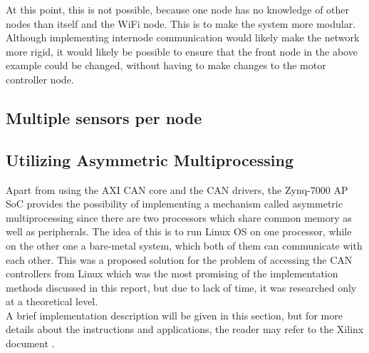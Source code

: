 At this point, this is not possible, because one node has no knowledge of other nodes than itself and the WiFi node. 
This is to make the system more modular.
Although implementing internode communication would likely make the network more rigid, it would likely be possible to ensure that the front node in the above example could be changed, without having to make changes to the motor controller node.

\subsection{Multiple sensors per node}


\subsection{Utilizing Asymmetric Multiprocessing}

Apart from using the AXI CAN core and the CAN drivers, the Zynq-7000 AP SoC provides the possibility of implementing a mechanism called asymmetric multiprocessing since there are two processors which share common memory as well as peripherals.
The idea of this is to run Linux OS on one processor, while on the other one a bare-metal system, which both of them can communicate with each other.
This was a proposed solution for the problem of accessing the CAN controllers from Linux which was the most promising of the implementation methods discussed in this report, but due to lack of time, it was researched only at a theoretical level.
\\
A brief implementation description will be given in this section, but for more details about the instructions and applications, the reader may refer to the Xilinx document \cite{Xilinx_AMP}.


